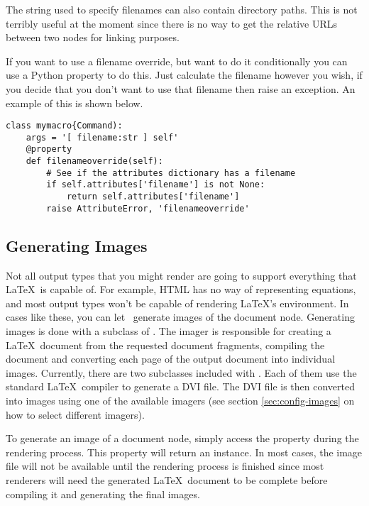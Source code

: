 The string used to specify filenames can also contain directory paths.
This is not terribly useful at the moment since there is no way to
get the relative URLs between two nodes for linking purposes.

If you want to use a filename override, but want to do it conditionally
you can use a Python property to do this.  Just calculate the filename
however you wish, if you decide that you don't want to use that filename
then raise an  exception.  An example of this
is shown below.
\begin{verbatim}
class mymacro{Command):
    args = '[ filename:str ] self'
    @property
    def filenameoverride(self):
        # See if the attributes dictionary has a filename
        if self.attributes['filename'] is not None:
            return self.attributes['filename']
        raise AttributeError, 'filenameoverride'
\end{verbatim}


\subsection{Generating Images}

Not all output types that you might render are going to support everything
that \LaTeX\ is capable of.  For example, HTML has no way of representing
equations, and most output types won't be capable of rendering
\LaTeX's  environment.  In cases like these, you
can let \plasTeX\ generate images of the document node.  Generating
images is done with a subclass of .
The imager is responsible for creating a \LaTeX\ document from the
requested document fragments, compiling the document and converting
each page of the output document into individual images.  Currently,
there are two  subclasses included with \plasTeX.
Each of them use the standard \LaTeX\ compiler to generate a DVI file.
The DVI file is then converted into images using one of the available
imagers (see section \ref{sec:config-images} on how to select different imagers).

To generate an image of a document node, simply access the 
property during the rendering process.  This property will return
an  instance.  In most cases, the image
file will not be available until the rendering process is finished
since most renderers will need the generated \LaTeX\ document to be
complete before compiling it and generating the final images.

